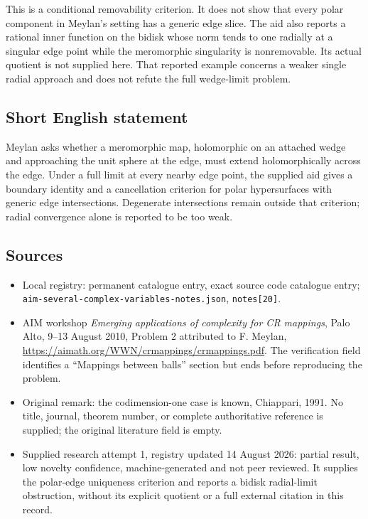 \documentclass[11pt]{article}
\begin{document}
This is a conditional removability criterion. It does not show that every polar component in Meylan's setting has a generic edge slice. The aid also reports a rational inner function on the bidisk whose norm tends to one radially at a singular edge point while the meromorphic singularity is nonremovable. Its actual quotient is not supplied here. That reported example concerns a weaker single radial approach and does not refute the full wedge-limit problem.
\subsection{Short English statement}
Meylan asks whether a meromorphic map, holomorphic on an attached wedge and approaching the unit sphere at the edge, must extend holomorphically across the edge. Under a full limit at every nearby edge point, the supplied aid gives a boundary identity and a cancellation criterion for polar hypersurfaces with generic edge intersections. Degenerate intersections remain outside that criterion; radial convergence alone is reported to be too weak.
\subsection{Sources}
\begin{itemize}
\item Local registry: permanent catalogue entry, exact source code catalogue entry; \texttt{aim-several-complex-variables-notes.json}, \texttt{notes[20]}.
\item AIM workshop \emph{Emerging applications of complexity for CR mappings}, Palo Alto, 9--13 August 2010, Problem 2 attributed to F. Meylan, \url{https://aimath.org/WWN/crmappings/crmappings.pdf}. The verification field identifies a ``Mappings between balls'' section but ends before reproducing the problem.
\item Original remark: the codimension-one case is known, Chiappari, 1991. No title, journal, theorem number, or complete authoritative reference is supplied; the original literature field is empty.
\item Supplied research attempt 1, registry updated 14 August 2026: partial result, low novelty confidence, machine-generated and not peer reviewed. It supplies the polar-edge uniqueness criterion and reports a bidisk radial-limit obstruction, without its explicit quotient or a full external citation in this record.
\end{itemize}
\end{document}

